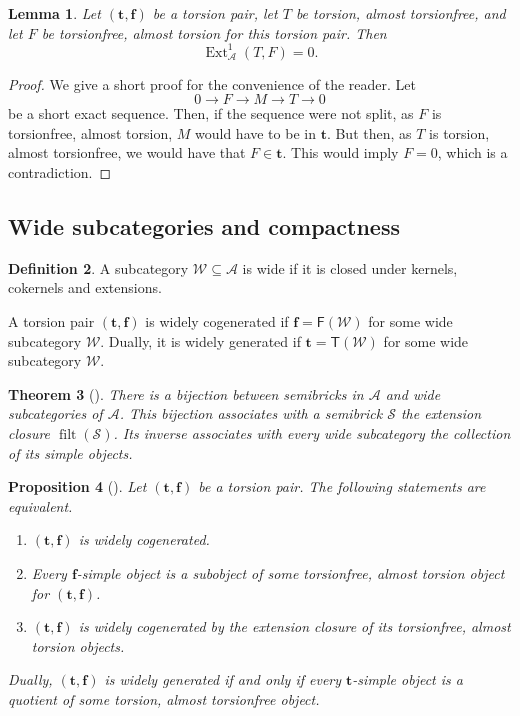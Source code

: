 \documentclass[11pt]{amsart}
\newtheorem{theorem}{Theorem}[section]
\newtheorem{proposition}[theorem]{Proposition}
\newtheorem{lemma}[theorem]{Lemma}
\theoremstyle{definition}
\newtheorem{definition}[theorem]{Definition}
\newcommand{\A}{\mathcal A}
\newcommand{\W}{\mathcal W}
\newcommand{\T}{\mathsf T}
\newcommand{\F}{\mathsf F}
\newcommand{\filt}{\operatorname{filt}}
\newcommand{\Ext}{\operatorname{Ext}}
\begin{document}
\begin{lemma}\label{lem:ext-orthogonality}
Let \((\mathbf t,\mathbf f)\) be a torsion pair, let \(T\) be torsion, almost torsionfree, and let \(F\) be torsionfree, almost torsion for this torsion pair. Then
\[
\Ext^1_\A(T,F)=0.
\]
\end{lemma}

\begin{proof}
We give a short proof for the convenience of the reader. Let 
\[
0 \to F \to M \to T \to 0
\]
be a short exact sequence. Then, if the sequence were not split, as $ F $ is torsionfree, almost torsion, $ M $ would have to be in $ \mathbf{t} $. But then, as $ T $ is torsion, almost torsionfree, we would have that $ F \in \mathbf{t} $. This would imply $ F = 0 $, which is a contradiction.
\end{proof}


\subsection{Wide subcategories and compactness}

\begin{definition}
A subcategory \(\W\subseteq\A\) is wide if it is closed under kernels, cokernels and extensions.

A torsion pair \((\mathbf t,\mathbf f)\) is widely cogenerated if \(\mathbf f=\F(\W)\) for some wide subcategory \(\W\). Dually, it is widely generated if \(\mathbf t=\T(\W)\) for some wide subcategory \(\W\).
\end{definition}

\begin{theorem}[{\cite[Section 1.2]{RingelSpecies}}]\label{thm:ringel-semibricks}
There is a bijection between semibricks in \(\A\) and wide subcategories of \(\A\). This bijection associates with a semibrick \(\mathcal S\) the extension closure \(\filt(\mathcal S)\). Its inverse associates with every wide subcategory the collection of its simple objects.
\end{theorem}

\begin{proposition}[{\cite[Proposition 5.2]{EnomotoMonobrick}}]\label{prop:wide-cogenerated-criterion}
Let \((\mathbf t,\mathbf f)\) be a torsion pair. The following statements are equivalent.
\begin{enumerate}[label=\textup{(\arabic*)},leftmargin=2.5em]
\item \((\mathbf t,\mathbf f)\) is widely cogenerated.
\item Every \(\mathbf f\)-simple object is a subobject of some torsionfree, almost torsion object for \((\mathbf t,\mathbf f)\).
\item \((\mathbf t,\mathbf f)\) is widely cogenerated by the extension closure of its torsionfree, almost torsion objects.
\end{enumerate}
Dually, \((\mathbf t,\mathbf f)\) is widely generated if and only if every \(\mathbf t\)-simple object is a quotient of some torsion, almost torsionfree object.
\end{proposition}
\end{document}
